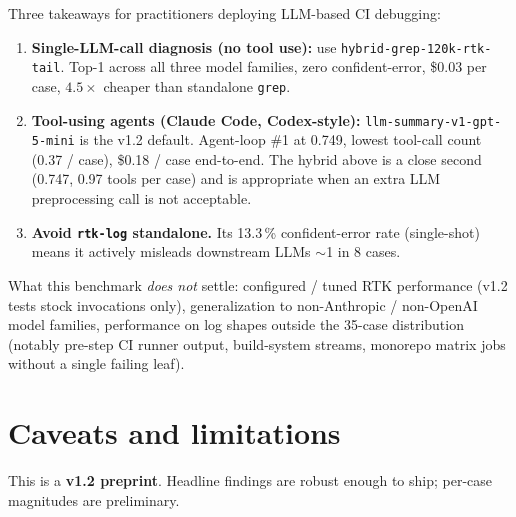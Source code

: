 \documentclass{article}
\begin{document}
Three takeaways for practitioners deploying LLM-based CI debugging:

\begin{enumerate}
  \item \textbf{Single-LLM-call diagnosis (no tool use):} use
  \texttt{hybrid-grep-120k-rtk-tail}. Top-1 across all three model
  families, zero confident-error, \$0.03 per case, $4.5\times$
  cheaper than standalone \texttt{grep}.
  \item \textbf{Tool-using agents (Claude Code, Codex-style):}
  \texttt{llm-summary-v1-gpt-5-mini} is the v1.2 default. Agent-loop
  \#1 at 0.749, lowest tool-call count (0.37 / case), \$0.18 / case
  end-to-end. The hybrid above is a close second (0.747, 0.97 tools
  per case) and is appropriate when an extra LLM preprocessing call
  is not acceptable.
  \item \textbf{Avoid \texttt{rtk-log} standalone.} Its 13.3\,\%
  confident-error rate (single-shot) means it actively misleads
  downstream LLMs $\sim$1 in 8 cases.
\end{enumerate}

What this benchmark \emph{does not} settle: configured / tuned RTK
performance (v1.2 tests stock invocations only), generalization to
non-Anthropic / non-OpenAI model families, performance on log shapes
outside the 35-case distribution (notably pre-step CI runner
output, build-system streams, monorepo matrix jobs without a single
failing leaf).

\section{Caveats and limitations}

This is a \textbf{v1.2 preprint}. Headline findings are robust enough
to ship; per-case magnitudes are preliminary.
\end{document}
